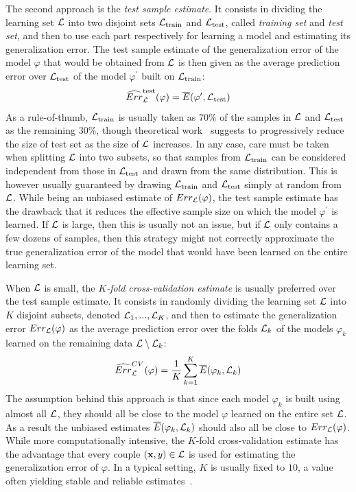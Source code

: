 The second approach is the \textit{test sample estimate}. It consists in
dividing the learning set ${\cal L}$ into two disjoint sets ${\cal
L}_\text{train}$ and ${\cal L}_\text{test}$, called \textit{training set} and
\textit{test set}, and then to use each part respectively for learning a model
and estimating its generalization error. The test sample estimate of the
generalization error of the model $\varphi$ that would be obtained from ${\cal
L}$ is then given as the average prediction error over ${\cal L}_\text{test}$
of the model $\varphi^\prime$ built on ${\cal L}_\text{train}$:
\begin{equation}\label{eqn:test-error}
\widehat{Err}_{\cal L}^\text{test}(\varphi) = \overline{E}(\varphi^\prime, {\cal L}_\text{test})
\end{equation}
As a rule-of-thumb,
${\cal L}_\text{train}$ is usually taken as $70\%$ of the samples in
${\cal L}$ and ${\cal L}_\text{test}$ as the remaining $30\%$, though
theoretical work~\citep{guyon:1997} suggests to progressively reduce the size of test set as
the size of ${\cal L}$ increases. In any case, care must be taken when splitting ${\cal
L}$ into two subsets, so that samples from ${\cal L}_\text{train}$ can be
considered independent from those in ${\cal L}_\text{test}$ and drawn from the
same distribution. This is however usually guaranteed by drawing ${\cal
L}_\text{train}$ and ${\cal L}_\text{test}$ simply at random from ${\cal L}$.
While being an unbiased estimate of $Err_{\cal L}(\varphi)$, the test sample
estimate has the drawback that it reduces the
effective sample size on which the model $\varphi^\prime$ is learned. If ${\cal L}$ is large,
then this is usually not an issue, but if ${\cal L}$ only contains a few dozens
of samples, then this strategy might not correctly approximate the true
generalization error of the model that would have been learned on the entire learning set.

When ${\cal L}$ is small, the \textit{$K$-fold cross-validation estimate} is
usually preferred over the test sample estimate. It consists in randomly
dividing the learning set ${\cal L}$ into $K$ disjoint subsets, denoted  ${\cal
L}_1, ..., {\cal L}_K$, and then to estimate the generalization error $Err_{\cal
L}(\varphi)$ as the average prediction error over the folds ${\cal L}_k$ of the
models $\varphi_k$  learned on the remaining data ${\cal L}\setminus{\cal
L}_k$:
\begin{equation}\label{eqn:cv-error}
\widehat{Err}_{\cal L}^{CV}(\varphi) = \frac{1}{K} \sum_{k=1}^K  \overline{E}(\varphi_k, {\cal L}_k)
\end{equation}
The assumption behind this approach is that since each model $\varphi_k$ is
built using almost all ${\cal L}$, they should all be close to the model
$\varphi$ learned on the entire set ${\cal L}$. As a result the unbiased
estimates $\overline{E}(\varphi_k, {\cal L}_k)$ should also all be close to
$Err_{\cal L}(\varphi)$. While more computationally intensive, the $K$-fold
cross-validation estimate has the advantage that every couple $(\mathbf{x}, y)
\in {\cal L}$ is used for estimating the generalization error of $\varphi$. In
a typical setting, $K$ is usually fixed to $10$, a value often yielding stable
and reliable estimates~\citep{kohavi:1995}.

